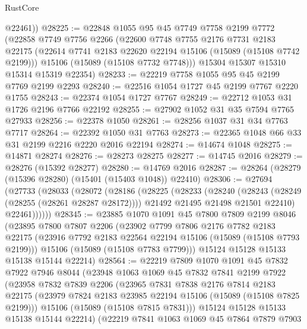 \begin{lexlean}{RustCore}
\begin{coremodule}
        @22461))
@28225 := @22848
    @1055
    @95
    @45
    @7749
    @7758
    @2199
    @7772
    (@22858
      @7749
      @7756
      @2266
      (@22600
        @7748
        @7755
        @2176
        @7731
        @2183
        @22175
        (@22614 @7741 @2183 @22620 @22194 @15106 (@15089 (@15108 @7742 @2199)))
        @15106
        (@15089 (@15108 @7732 @7748)))
      @15304
      @15307
      @15310
      @15314
      @15319
      @22354)
@28233 := @22219 @7758 @1055 @95 @45 @2199 @7769 @2199 @2293
@28240 := @22516 @1054 @1727 @45 @2199 @7767 @2220 @1755
@28243 := @22374 @1054 @1727 @7767
@28249 := @22712 @1053 @31 @1726 @2196 @7766 @22192
@28255 := @27902 @1052 @31 @35 @7594 @7765 @27933
@28256 := @22378 @1050
@28261 := @28256 @1037 @31 @34 @7763 @7717
@28264 := @22392 @1050 @31 @7763
@28273 := @22365 @1048 @66 @33 @31 @2199 @2216 @2220 @2016 @22194
@28274 := @14674 @1048
@28275 := @14871 @28274
@28276 := @28273 @28275
@28277 := @14745 @2016
@28279 := @28276 (@15392 @28277)
@28280 := @14769 @2016
@28287 := @28264 (@28279 (@15396 @28280) (@15401 (@15403 @1048)) @22410)
@28306 := @27694
    (@27733
      (@28033
        (@28072
          (@28186
            (@28225
              (@28233
                (@28240
                  (@28243 (@28249 (@28255 (@28261 @28287 @28172))))
                  @21492
                  @21495
                  @21498
                  @21501
                  @22410)
                @22461))))))
@28345 := @23885
    @1070
    @1091
    @45
    @7800
    @7809
    @2199
    @8046
    (@23895
      @7800
      @7807
      @2206
      (@23902
        @7799
        @7806
        @2176
        @7782
        @2183
        @22175
        (@23916 @7792 @2183 @22564 @22194 @15106 (@15089 (@15108 @7793 @2199)))
        @15106
        (@15089 (@15108 @7783 @7799)))
      @15124
      @15128
      @15133
      @15138
      @15144
      @22214)
@28564 := @22219
    @7809
    @1070
    @1091
    @45
    @7832
    @7922
    @7946
    @8044
    (@23948
      @1063
      @1069
      @45
      @7832
      @7841
      @2199
      @7922
      (@23958
        @7832
        @7839
        @2206
        (@23965
          @7831
          @7838
          @2176
          @7814
          @2183
          @22175
          (@23979 @7824 @2183 @23985 @22194 @15106 (@15089 (@15108 @7825 @2199)))
          @15106
          (@15089 (@15108 @7815 @7831)))
        @15124
        @15128
        @15133
        @15138
        @15144
        @22214)
      (@22219
        @7841
        @1063
        @1069
        @45
        @7864
        @7879
        @7903

\end{coremodule}
\end{lexlean}
